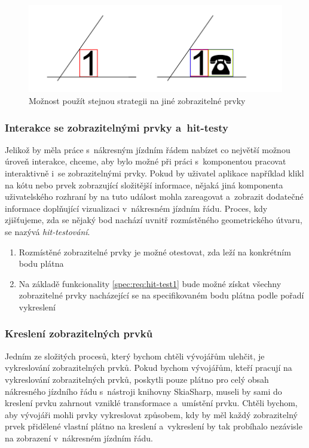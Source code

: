 \begin{figure}[!htb]
	\centering					
	\includegraphics[width=.7\textwidth]{../img/kap2_view_elements_strategies}
	\caption{Možnost použít stejnou strategii na jiné zobrazitelné prvky}
	\label{fig:spec:jine_rozmistitelne_prvky}
\end{figure}

\pagebreak
\subsubsection*{Interakce se zobrazitelnými prvky a~hit-testy}
Jelikož by měla práce s~nákresným jízdním řádem nabízet co největší možnou úroveň interakce, chceme, aby bylo možné při práci s~komponentou pracovat interaktivně i~se zobrazitelnými prvky. Pokud by uživatel aplikace například klikl na kótu nebo prvek zobrazující složitější informace, nějaká jiná komponenta uživatelského rozhraní by na tuto událost mohla zareagovat a~zobrazit dodatečné informace doplňující vizualizaci v~nákresném jízdním řádu. Proces, kdy zjišťujeme, zda se nějaký bod nachází uvnitř rozmístěného geometrického útvaru, se nazývá \textit{hit-testování}.

\begin{enumerate}[label=\color{reqcolor}\textbf{R{\arabic*}},resume]
	\item \label{spec:req:hit-test1} Rozmístěné zobrazitelné prvky je možné otestovat, zda leží na konkrétním bodu plátna
	\item \label{spec:req:hit-test2} Na základě funkcionality \ref{spec:req:hit-test1} bude možné získat všechny zobrazitelné \linebreak prvky nacházející se na specifikovaném bodu plátna podle pořadí vykreslení 
\end{enumerate}

\subsubsection*{Kreslení zobrazitelných prvků}
Jedním ze složitých procesů, který bychom chtěli vývojářům ulehčit, je vykreslování zobrazitelných prvků. Pokud bychom vývojářům, kteří pracují na vykreslování zobrazitelných prvků, poskytli pouze plátno pro celý obsah nákresného jízdního řádu s~nástroji knihovny SkiaSharp, museli by sami do kreslení prvku zahrnout vzniklé transformace a~umístění prvku. Chtěli bychom, aby vývojáři mohli prvky vykreslovat způsobem, kdy by měl každý zobrazitelný prvek přidělené vlastní plátno na kreslení a~vykreslení by tak probíhalo nezávisle na zobrazení v~nákresném jízdním řádu.

